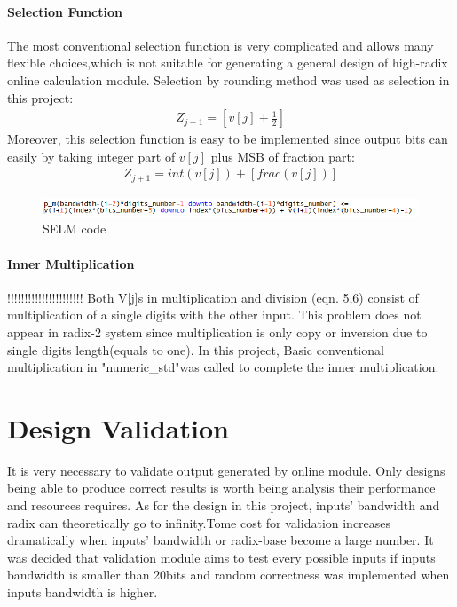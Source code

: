 \documentclass[10pt]{article}
\begin{document}
\paragraph{Selection Function}


The most conventional selection function is very complicated and allows many flexible choices,which is not
suitable for generating a general design of high-radix online calculation module. Selection by rounding  method \cite{c2} was used as selection in this project:
\begin{gather}
    Z_{j+1} = [v[j]+\frac{1}{2}]
\end{gather}
Moreover, this selection function is easy to be implemented since output bits can easily by taking integer part of $v[j]$ plus MSB of fraction part:
\begin{gather}
    Z_{j+1} = int(v[j])+[frac(v[j])]
\end{gather}

     \begin{figure}[H]
       \centering
       \includegraphics[scale=0.75]{code_SELM.PNG}
       \caption{SELM code}
    \end{figure}
    
\paragraph{Inner Multiplication}
!!!!!!!!!!!!!!!!!!!!!!
Both V[j]s in multiplication and division (eqn. 5,6) consist of multiplication of a single digits with the other input. This problem does not appear in radix-2 system since multiplication is only copy or inversion due to single digits length(equals to one). In this project, Basic conventional multiplication in "numeric\_std"was called to complete the inner multiplication.    

\section{Design Validation}

It is very necessary to validate output generated by online module. Only designs being able to produce correct results is worth being analysis their performance and resources requires. As for the design in this project, inputs' bandwidth and radix can theoretically go to infinity.Tome cost for validation increases dramatically when inputs' bandwidth or radix-base become a large number. It was decided that validation  module aims to test every possible inputs if inputs bandwidth is smaller than 20bits and random correctness was implemented when inputs bandwidth is higher.
\end{document}
